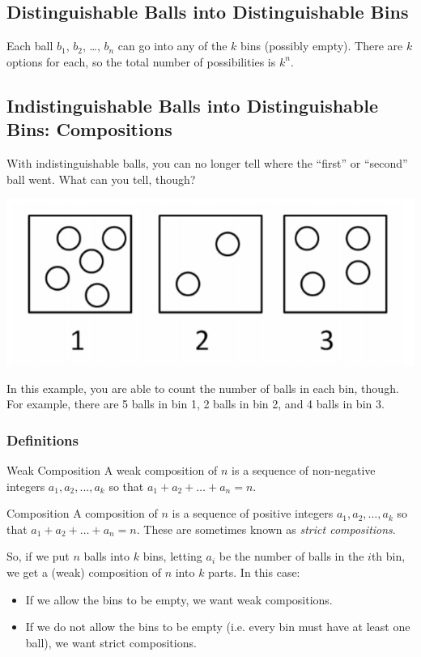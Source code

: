 \documentclass[letterpaper]{article}
\begin{document}
\subsection{Distinguishable Balls into Distinguishable Bins}
Each ball $b_1$, $b_2$, \dots, $b_n$ can go into any of the $k$ bins (possibly empty). There are $k$ options for each, so the total number of possibilities is $k^n$. 

\subsection{Indistinguishable Balls into Distinguishable Bins: Compositions}
With indistinguishable balls, you can no longer tell where the ``first'' or ``second'' ball went. What can you tell, though? 
\begin{center}
    \includegraphics[scale=0.4]{img/ind_ball_i_bin.PNG}
\end{center}
In this example, you are able to count the number of balls in each bin, though. For example, there are 5 balls in bin 1, 2 balls in bin 2, and 4 balls in bin 3.

\subsubsection{Definitions}

\begin{definition}{Weak Composition}{}
    A weak composition of $n$ is a sequence of non-negative integers $a_1, a_2, ..., a_k$ so that $a_1 + a_2 + \dots + a_n = n$.
\end{definition}

\begin{definition}{Composition}{}
    A composition of $n$ is a sequence of positive integers $a_1, a_2, \dots, a_k$ so that $a_1 + a_2 + \dots + a_n = n$. These are sometimes known as \emph{strict compositions}.
\end{definition}

So, if we put $n$ balls into $k$ bins, letting $a_i$ be the number of balls in the $i$th bin, we get a (weak) composition of $n$ into $k$ parts. In this case:
\begin{itemize}
    \item If we allow the bins to be empty, we want weak compositions. 
    \item If we do not allow the bins to be empty (i.e. every bin must have at least one ball), we want strict compositions. 
\end{itemize}
\end{document}
